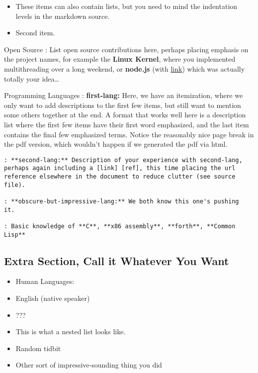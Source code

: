 \documentclass[]{article}
\begin{document}
\begin{itemize}
\itemsep1pt\parskip0pt
\item
  These items can also contain lists, but you need to mind the
  indentation levels in the markdown source.
\item
  Second item.
\end{itemize}

Open Source : List open source contributions here, perhaps placing
emphasis on the project names, for example the \textbf{Linux Kernel},
where you implemented multithreading over a long weekend, or
\textbf{node.js} (with \href{http://nodejs.org}{link}) which was
actually totally your idea\ldots{}

Programming Languages : \textbf{first-lang:} Here, we have an
itemization, where we only want to add descriptions to the first few
items, but still want to mention some others together at the end. A
format that works well here is a description list where the first few
items have their first word emphasized, and the last item contains the
final few emphasized terms. Notice the reasonably nice page break in the
pdf version, which wouldn't happen if we generated the pdf via html.

\begin{verbatim}
: **second-lang:** Description of your experience with second-lang,
perhaps again including a [link] [ref], this time placing the url
reference elsewhere in the document to reduce clutter (see source
file).

: **obscure-but-impressive-lang:** We both know this one's pushing
it.
 
: Basic knowledge of **C**, **x86 assembly**, **forth**, **Common Lisp**
\end{verbatim}

\subsection{Extra Section, Call it Whatever You
Want}\label{extra-section-call-it-whatever-you-want}

\begin{itemize}
\item
  Human Languages:
\item
  English (native speaker)
\item
  ???
\item
  This is what a nested list looks like.
\item
  Random tidbit
\item
  Other sort of impressive-sounding thing you did
\end{itemize}
\end{document}
